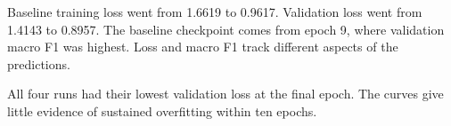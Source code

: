 Baseline training loss went from 1.6619 to 0.9617. Validation loss went from 1.4143 to 0.8957. The baseline checkpoint comes from epoch 9, where validation macro F1 was highest. Loss and macro F1 track different aspects of the predictions.

All four runs had their lowest validation loss at the final epoch. The curves give little evidence of sustained overfitting within ten epochs.
